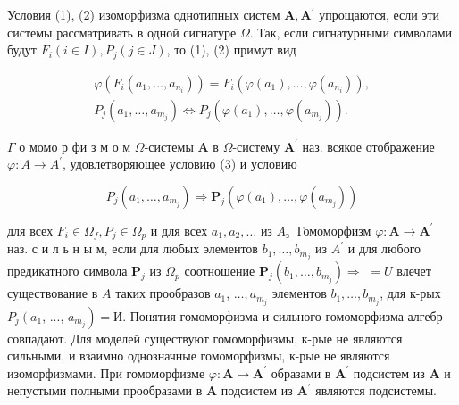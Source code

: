 \documentclass[10pt]{article}
\begin{document}
Условия (1), (2) изоморфизма однотипных систем $\boldsymbol{A}, \boldsymbol{A}^{\prime}$ упрощаются, если эти системы рассматривать в одной сигнатуре $\Omega$. Так, если сигнатурными символами будут $F_{i}(i \in I), P_{j}(j \in J)$, то (1), (2) примут вид



\[

\begin{gathered}

\varphi\left(F_{i}\left(a_{1}, \ldots, a_{n_{i}}\right)\right)=F_{i}\left(\varphi\left(a_{1}\right), \ldots, \varphi\left(a_{n_{i}}\right)\right), \\

P_{j}\left(a_{1}, \ldots, a_{m_{j}}\right) \Longleftrightarrow P_{j}\left(\varphi\left(a_{1}\right), \ldots, \varphi\left(a_{m_{j}}\right)\right) .

\end{gathered}

\]



$\Gamma$ о момо р фи з м о м $\Omega$-системы $\boldsymbol{A}$ в $\Omega$-систему $\boldsymbol{A}^{\prime}$ наз. всякое отображение $\varphi: A \rightarrow A^{\prime}$, удовлетворяющее условию (3) и условию



\[

P_{j}\left(a_{1}, \ldots, a_{m_{j}}\right) \Rightarrow \boldsymbol{P}_{j}\left(\varphi\left(a_{1}\right), \ldots, \varphi\left(a_{m_{j}}\right)\right)

\]



для всех $F_{i} \in \Omega_{f}, P_{j} \in \Omega_{p}$ и для всех $a_{1}, a_{2}, \ldots$ из $A_{\text {з }}$ Гомоморфизм $\varphi: \boldsymbol{A} \rightarrow \boldsymbol{A}^{\prime}$ наз. с и л ь н ы м, если для любых элементов $b_{1}, \ldots, b_{m_{j}}$ из $A^{\prime}$ и для любого предикатного символа $\boldsymbol{P}_{j}$ из $\Omega_{p}$ соотношение $\boldsymbol{P}_{j}\left(b_{1}, \ldots, b_{m_{j}}\right) \Rightarrow$ $=U$ влечет существование в $A$ таких прообразов $a_{1}$, $\ldots, a_{m_{j}}$ элементов $b_{1}, \ldots, b_{m_{j}}$, для к-рых $P_{j}\left(a_{1}\right.$, ..., $\left.a_{m_{j}}\right)=И$. Понятия гомоморфизма и сильного гомоморфизма алгебр совпадают. Для моделей существуют гомоморфизмы, к-рые не являются сильными, и взаимно однозначные гомоморфизмы, к-рые не являются изоморфизмами. При гомоморфизме $\varphi: \boldsymbol{A} \rightarrow \boldsymbol{A}^{\prime}$ образами в $\boldsymbol{A}^{\prime}$ подсистем из $\boldsymbol{A}$ и непустыми полными прообразами в $\boldsymbol{A}$ подсистем из $\boldsymbol{A}^{\prime}$ являются подсистемы.
\end{document}
